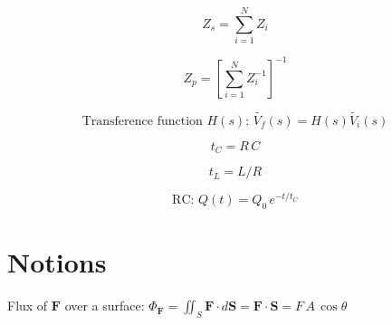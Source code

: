 \documentclass{form}
\begin{document}
\begin{minipage}[c]{0.10\textwidth}
	\begin{equation*}
		Z_s = \sum_{i=1}^{N}{Z_i}
	\end{equation*}
\end{minipage}%
\begin{minipage}[c]{0.16\textwidth}
	\begin{equation*}
		Z_p = \left[\sum_{i=1}^{N}{Z_i^{-1}}\right]^{-1}
	\end{equation*}
\end{minipage}%
\begin{minipage}[c]{0.38\textwidth}
	\begin{equation*}
		\text{Transference function $H(s)$: } \tilde{V_f}(s)=H(s)\tilde{V_i}(s)
	\end{equation*}
\end{minipage}
\begin{center}
	\begin{minipage}[c]{0.1\textwidth}
		\begin{equation*}
			t_C=R\,C
		\end{equation*}
	\end{minipage}
	\begin{minipage}[c]{0.1\textwidth}
		\begin{equation*}
			t_L=L/R
		\end{equation*}
	\end{minipage}
	\begin{minipage}[c]{0.2\textwidth}
		\begin{equation*}
			\text{RC: } Q(t)=Q_0\,e^{-t/t_C}
		\end{equation*}
	\end{minipage}
\end{center}
\vspace*{0.5em}
\begin{minipage}[c]{0.2\textwidth}
	\section*{Notions}
\end{minipage}
\begin{minipage}[c]{0.75\textwidth}
	Flux of $\mathbf{F}$ over a surface: $\displaystyle \Phi_{\mathbf{F}}= \iint_S{\mathbf{F}\cdot d\mathbf{S}} = \mathbf{F} \cdot \mathbf{S} = F\,A\,\cos\theta$
\end{minipage}
\vspace*{0.5em}
\end{document}
